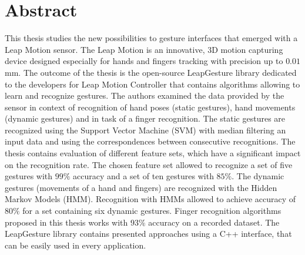 \chapter{Abstract}
This thesis studies the new possibilities to gesture interfaces that emerged with a Leap Motion sensor.
The Leap Motion is an innovative, 3D motion capturing device designed especially for hands and fingers tracking with precision up to $0.01$mm.
The outcome of the thesis is the open-source LeapGesture library dedicated to the developers for Leap Motion Controller that contains algorithms allowing to learn and recognize gestures.
The authors examined the data provided by the sensor in context of recognition of hand poses (static gestures), hand movements (dynamic gestures) and in task of a finger recognition.
The static gestures are recognized using the Support Vector Machine (SVM) with median filtering an input data and using the correspondences between consecutive recognitions.
The thesis contains evaluation of different feature sets, which have a significant impact on the recognition rate.
The chosen feature set allowed to recognize a set of five gestures with $99\%$ accuracy and a set of ten gestures with $85\%$.
The dynamic gestures (movements of a hand and fingers) are recognized with the Hidden Markov Models (HMM). 
Recognition with HMMs allowed to achieve accuracy of $80\%$ for a set containing six dynamic gestures.
Finger recognition algorithms proposed in this thesis works with $93\%$ accuracy on a recorded dataset.
The LeapGesture library contains presented approaches using a C++ interface, that can be easily used in every application.